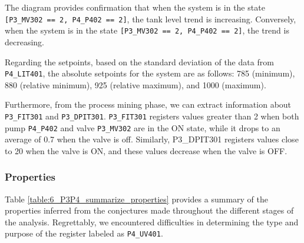 \bigskip
The diagram provides confirmation that when the system is in the state \texttt{[P3\_MV302 == 2, P4\_P402 == 2]}, the tank level trend is increasing. Conversely, when the system is in the state \texttt{[P3\_MV302 == 2, P4\_P402 == 2]}, the trend is decreasing.

\bigskip
Regarding the setpoints, based on the standard deviation of the data from \texttt{P4\_LIT401}, the absolute setpoints for the system are as follows: 785 (minimum), 880 (relative minimum), 925 (relative maximum), and 1000 (maximum).

\bigskip
Furthermore, from the process mining phase, we can extract information about \texttt{P3\_FIT301} and \texttt{P3\_DPIT301}. \texttt{P3\_FIT301} registers values greater than 2 when both pump \texttt{P4\_P402} and valve \texttt{P3\_MV302} are in the ON state, while it drops to an average of 0.7 when the valve is off. Similarly, P3\_DPIT301 registers values close to 20 when the valve is ON, and these values decrease when the valve is OFF.
\vfill

\subsubsection{Properties}
\label{subsubsec:6_P3P4_summary_table}

Table \ref{table:6_P3P4_summarize_properties} provides a summary of the properties inferred from the conjectures made throughout the different stages of the analysis. Regrettably, we encountered difficulties in determining the type and purpose of the register labeled as \texttt{P4\_UV401}.


